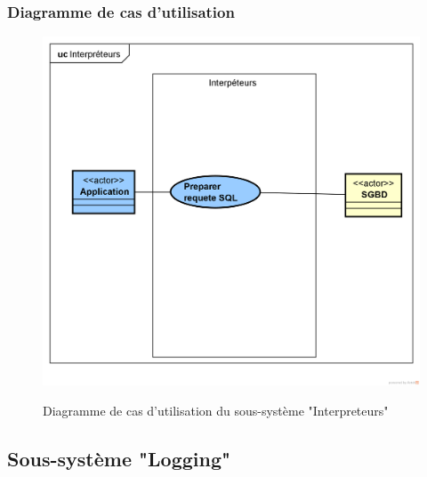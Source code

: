 \subsubsection{Diagramme de cas d'utilisation}
\begin{figure}[H]
	\centering
	\begin{minipage}{12cm}
		\centering
		{\includegraphics[height=0.3\textheight, width=1\textwidth]{fig/Interpreteurs-use-case-diagram.png}}
	\end{minipage}
	\caption{Diagramme de cas d'utilisation du sous-système "Interpreteurs"}
	\label{fig:7.18}
\end{figure}


\subsection{Sous-système "Logging"}
